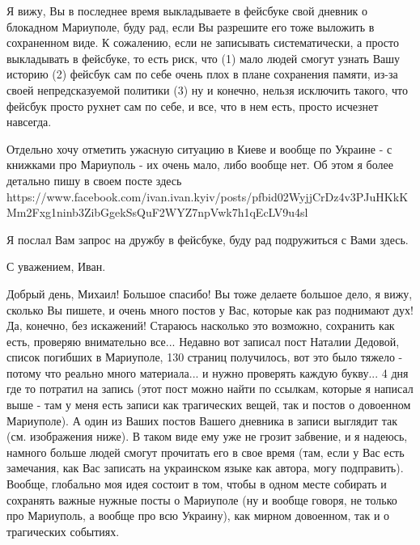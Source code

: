 Я вижу, Вы в последнее время выкладываете в фейсбуке свой дневник о блокадном Мариуполе,
буду рад, если Вы разрешите его тоже выложить в сохраненном виде. 
К сожалению, если не записывать систематически, а просто выкладывать в фейсбуке,
то есть риск, что (1) мало людей смогут узнать Вашу историю (2) фейсбук сам по себе очень плох
в плане сохранения памяти, из-за своей непредсказуемой политики (3) ну и конечно, нельзя исключить
такого, что фейсбук просто рухнет сам по себе, и все, что в нем есть, просто исчезнет навсегда. 

Отдельно хочу отметить ужасную ситуацию в Киеве и вообще по Украине - с книжками про Мариуполь - 
их очень мало, либо вообще нет. Об этом я более детально пишу в своем посте здесь 
https://www.facebook.com/ivan.ivan.kyiv/posts/pfbid02WyjjCrDz4v3PJuHKkKMm2Fxg1ninb3ZibGgekSsQuF2WYZ7npVwk7h1qEcLV9u4sl

Я послал Вам запрос на дружбу в фейсбуке, буду рад
подружиться с Вами здесь. 

С уважением, Иван.


Добрый день, Михаил! Большое спасибо! Вы тоже делаете большое дело, я вижу,
сколько Вы пишете, и очень много постов у Вас, которые как раз поднимают дух!
Да, конечно, без искажений! Стараюсь насколько это возможно, сохранить как
есть, проверяю внимательно все... Недавно вот записал пост Наталии Дедовой,
список погибших в Мариуполе, 130 страниц получилось, вот это было тяжело -
потому что реально много материала... и нужно проверять каждую букву... 4 дня
где то потратил на запись (этот пост можно найти по ссылкам, которые я написал
выше - там у меня есть записи как трагических вещей, так и постов о довоенном
Мариуполе). А один из Ваших постов Вашего дневника в записи выглядит так (см.
изображения ниже). В таком виде ему уже не грозит забвение, и я надеюсь,
намного больше людей смогут прочитать его в свое время (там, если у Вас есть
замечания, как Вас записать на украинском языке как автора, могу подправить).
Вообще, глобально моя идея состоит в том, чтобы в одном месте собирать и
сохранять важные нужные посты о Мариуполе (ну и вообще говоря, не только про
Мариуполь, а вообще про всю Украину), как мирном довоенном, так и о трагических
событиях. 

